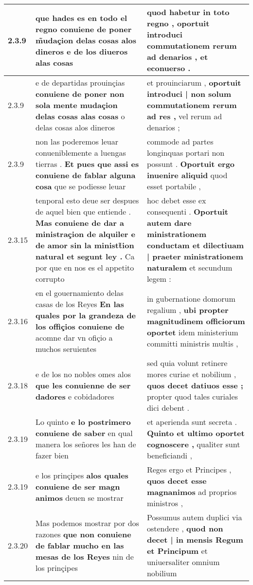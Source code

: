 \begin{tabular}{|p{1cm}|p{6.5cm}|p{6.5cm}|}
2.3.9 & que hades es en todo el regno \textbf{ conuiene de poner m̃udaçion delas cosas alos dineros } e de los diueros alas cosas & quod habetur in toto regno , \textbf{ oportuit introduci commutationem rerum ad denarios , } et econuerso . \\\hline
2.3.9 & e de departidas prouinçias \textbf{ conuiene de poner non sola mente mudaçion delas cosas alas cosas } o delas cosas alos dineros & et prouinciarum , \textbf{ oportuit introduci | non solum commutationem rerum ad res , } vel rerum ad denarios ; \\\hline
2.3.9 & non las poderemos leuar conueniblemente a luengas tierras . \textbf{ Et pues que assi es conuiene de fablar alguna cosa } que se podiesse leuar & commode ad partes longinquas portari non possunt . \textbf{ Oportuit ergo inuenire aliquid } quod esset portabile , \\\hline
2.3.15 & tenporal esto deue ser despues de aquel bien que entiende . \textbf{ Mas conuiene de dar a ministraçion de alquiler e de amor sin la ministt̃ion natural et segunt ley . } Ca por que en nos es el appetito corrupto & hoc debet esse ex consequenti . \textbf{ Oportuit autem dare ministrationem conductam et dilectiuam | praeter ministrationem naturalem } et secundum legem : \\\hline
2.3.16 & en el gouernamiento delas casas de los Reyes \textbf{ En las quales por la grandeza de los offiçios conuiene de } acomne dar vn ofiçio a muchos seruientes & in gubernatione domorum regalium , \textbf{ ubi propter magnitudinem officiorum oportet } idem ministerium committi ministris multis , \\\hline
2.3.18 & e de los no nobles omes alos \textbf{ que les conuienne de ser dadores } e cobidadores & sed quia volunt retinere mores curiae et nobilium , \textbf{ quos decet datiuos esse ; } propter quod tales curiales dici debent . \\\hline
2.3.19 & Lo quinto \textbf{ e lo postrimero conuiene de saber } en qual manera los señores les han de fazer bien & et aperienda sunt secreta . \textbf{ Quinto et ultimo oportet cognoscere , } qualiter sunt beneficiandi , \\\hline
2.3.19 & e los prinçipes \textbf{ alos quales conuiene de ser magn animos } deuen se mostrar & Reges ergo et Principes , \textbf{ quos decet esse magnanimos } ad proprios ministros , \\\hline
2.3.20 & Mas podemos mostrar por dos razones \textbf{ que non conuiene de fablar mucho en las mesas de los Reyes } nin de los prinçipes & Possumus autem duplici via ostendere , \textbf{ quod non decet | in mensis Regum et Principum } et uniuersaliter omnium nobilium \\\hline

\end{tabular}
